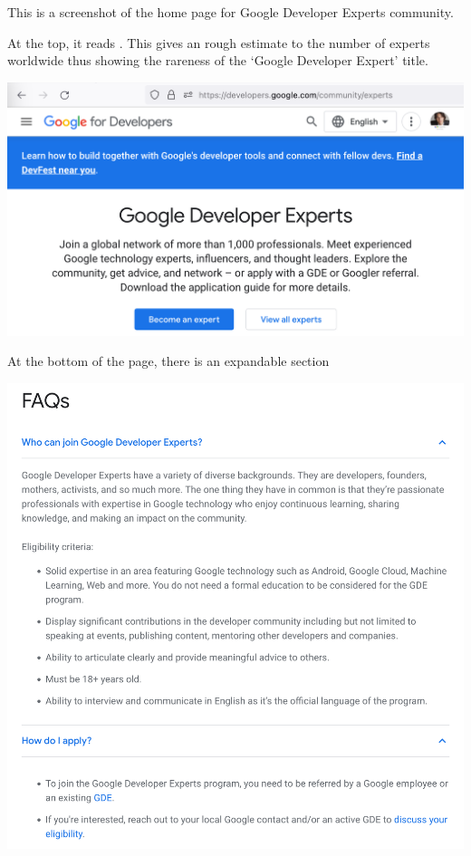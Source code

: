 
This is a screenshot of the home page for Google Developer Experts community.

At the top, it reads .
This gives an rough estimate to the number of experts worldwide
thus showing the rareness of the `Google Developer Expert' title.

\includegraphics[width=\textwidth]{home-p1}
\WillContinue

\pagebreak

At the bottom of the page, there is an expandable section 

\Continuing
\includegraphics[width=\textwidth]{home-bottom}

